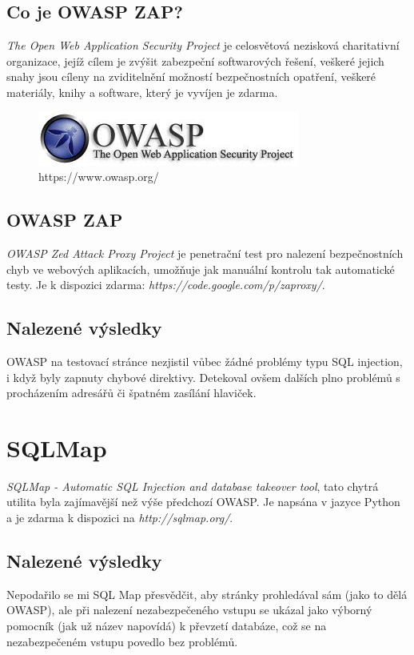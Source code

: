 \documentclass[12pt, a4paper]{report}
\begin{document}
\subsection{Co je OWASP ZAP?}
\textit{The Open Web Application Security Project} je celosvětová nezisková charitativní organizace, jejíž cílem je zvýšit zabezpeční softwarových řešení, veškeré jejich snahy jsou cíleny na zviditelnění možností bezpečnostních opatření, veškeré materiály, knihy a software, který je vyvíjen je zdarma. 

\begin{figure}[h!]
\centerline{\includegraphics[width=325px]{./examples/owasp.jpeg}}
\caption{https://www.owasp.org/}
\label{owasp}
\end{figure}

\subsection{OWASP ZAP}
\textit{OWASP Zed Attack Proxy Project} je penetrační test pro nalezení bezpečnostních chyb ve webových aplikacích, umožňuje jak manuální kontrolu tak automatické testy. Je k dispozici zdarma: \textit{https://code.google.com/p/zaproxy/}.

\subsection{Nalezené výsledky}
OWASP na testovací stránce nezjistil vůbec žádné problémy typu SQL injection, i když byly zapnuty chybové direktivy. Detekoval ovšem dalších plno problémů s procházením adresářů či špatném zasílání hlaviček.

\section{SQLMap}
\textit{SQLMap - Automatic SQL Injection and database takeover tool}, tato chytrá utilita byla zajímavější než výše předchozí OWASP. Je napsána v jazyce Python a je zdarma k dispozici na \textit{http://sqlmap.org/}. 

\subsection{Nalezené výsledky}
Nepodařilo se mi SQL Map přesvědčit, aby stránky prohledával sám (jako to dělá OWASP), ale při nalezení nezabezpečeného vstupu se ukázal jako výborný pomocník (jak už název napovídá) k převzetí databáze, což se na nezabezpečeném vstupu povedlo bez problémů.
\end{document}
